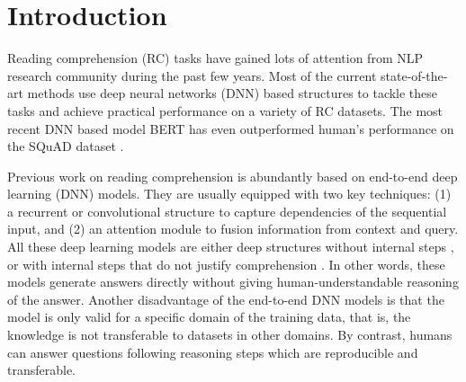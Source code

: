 \section{Introduction}
Reading comprehension (RC) tasks have gained lots of attention from NLP research community during the past few years.  %
Most of the current state-of-the-art methods use deep neural networks (DNN) based structures to tackle these tasks and achieve practical performance on a variety of RC datasets. The most recent DNN based model BERT \cite{DBLP:journals/corr/abs-1810-04805} has even outperformed human's performance on the SQuAD dataset \cite{DBLP:conf/emnlp/RajpurkarZLL16}.%



Previous work on reading comprehension is abundantly based on end-to-end deep learning (DNN) models. They are usually equipped with two key techniques: (1) a recurrent or convolutional structure to capture dependencies of the sequential input, and (2) an attention module to fusion information from context and query. All these deep learning models are either deep structures without internal steps \cite{DBLP:conf/iclr/SeoKFH17,DBLP:journals/corr/abs-1804-09541}, or with internal steps that do not justify comprehension \cite{DBLP:conf/kdd/ShenHGC17,DBLP:conf/ijcai/HuPHQW018,DBLP:conf/acl/MinZZH19}. In other words, these models generate answers directly without giving human-understandable reasoning of the answer. %
Another disadvantage of the end-to-end DNN models is that the model is only valid for a specific domain of the training data, that is, the knowledge is not transferable to datasets in other domains. %
By contrast, humans can answer questions following reasoning steps which are reproducible and transferable.  

